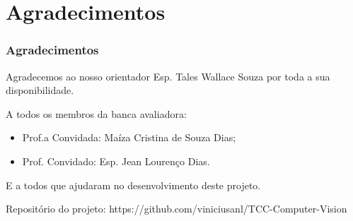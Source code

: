\section{Agradecimentos}
\begin{frame}
\frametitle{Agradecimentos}
\label{agradecimentos}

Agradecemos ao nosso orientador Esp. Tales Wallace Souza por toda a sua disponibilidade.

\vspace*{5mm}

A todos os membros da banca avaliadora:
\begin{itemize}
    \item Prof.a Convidada: Maíza Cristina de Souza Dias;
    \item Prof. Convidado: Esp. Jean Lourenço Dias.
\end{itemize}

\vspace*{5mm}

E a todos que ajudaram no desenvolvimento deste projeto.

\vspace*{5mm}

Repositório do projeto: https://github.com/viniciusanl/TCC-Computer-Vision


\end{frame}